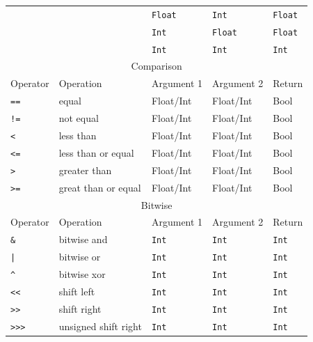 \documentclass{article}
\newcommand{\type}[1]{\texttt{#1}}
\newcommand{\expr}[1]{\texttt{#1}}
\begin{document}
\begin{center}
\begin{tabular}{| l | l | l | l | l |}
	& & \type{Float} & \type{Int} & \type{Float} \\
	& & \type{Int} & \type{Float} & \type{Float} \\
	& & \type{Int} & \type{Int} & \type{Int} \\	 \hline
	\multicolumn{5}{|c|}{Comparison} \\ \hline
	Operator & Operation & Argument 1 & Argument 2 & Return \\ \hline
	\expr{==} & equal & Float/Int & Float/Int & Bool \\
	\expr{!=} & not equal & Float/Int & Float/Int & Bool \\
	\expr{<} & less than & Float/Int & Float/Int & Bool \\
	\expr{<=} & less than or equal & Float/Int & Float/Int & Bool \\
	\expr{>} & greater than & Float/Int & Float/Int & Bool \\
	\expr{>=} & great than or equal & Float/Int & Float/Int & Bool \\ \hline
	\multicolumn{5}{|c|}{Bitwise} \\ \hline
	Operator & Operation & Argument 1 & Argument 2 & Return \\ \hline
	\expr{\&} & bitwise and & \type{Int} & \type{Int} & \type{Int} \\	
	\expr{|} & bitwise or & \type{Int} & \type{Int} & \type{Int} \\	
	\expr{\^} & bitwise xor & \type{Int} & \type{Int} & \type{Int} \\	
	\expr{<<} & shift left & \type{Int} & \type{Int} & \type{Int} \\
	\expr{>>} & shift right & \type{Int} & \type{Int} & \type{Int} \\
	\expr{>>>} & unsigned shift right & \type{Int} & \type{Int} & \type{Int} \\ \hline
\end{tabular}
\end{center}
\end{document}
